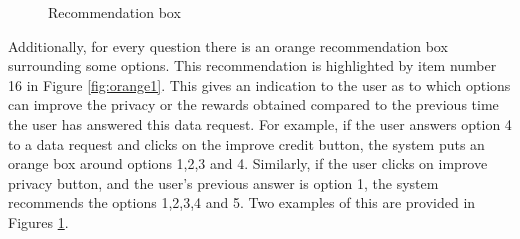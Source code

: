\begin{figure}[htp]
  \hspace{1em}
  \caption{Recommendation box}
  \label{fig:orange}
\end{figure}

Additionally, for every question there is an orange recommendation box surrounding some options. This recommendation is highlighted by item number 16 in Figure \ref{fig:orange1}.
This gives an indication to the user as to which options can improve the privacy or the rewards obtained compared to the previous time the user has
answered this data request. For example, if the user answers option 4 to a data request and clicks on the improve credit button, the system
puts an orange box around options 1,2,3 and 4. Similarly, if the user clicks on improve privacy button, and the user's previous answer is option 1, the system recommends the options 1,2,3,4 and 5. Two examples of this are provided in Figures \ref{fig:orange}. 

